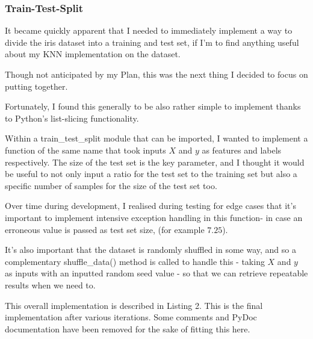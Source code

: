 \documentclass[letterpaper,10pt]{article}
\begin{document}
\subsubsection{Train-Test-Split}
It became quickly apparent that I needed to immediately implement a way to divide the iris dataset into a training and test set, if I'm to find anything useful about my KNN implementation on the dataset. \par
Though not anticipated by my Plan, this was the next thing I decided to focus on putting together. \par

Fortunately, I found this generally to be also rather simple to implement thanks to Python's list-slicing functionality. \par
Within a train\_test\_split module that can be imported, I wanted to implement a function of the same name that took inputs \(X\) and \(y\) as features and labels respectively. The size of the test set is the key parameter, and I thought it would be useful to not only input a ratio for the test set to the training set but also a specific number of samples for the size of the test set too. \par
Over time during development, I realised during testing for edge cases that it's important to implement intensive exception handling in this function- in case an erroneous value is passed as test set size, (for example \(7.25\)). \par
It's also important that the dataset is randomly shuffled in some way, and so a complementary shuffle\_data() method is called to handle this - taking \(X\) and \(y\) as inputs with an inputted random seed value - so that we can retrieve repeatable results when we need to. \par
This overall implementation is described in Listing 2. This is the final implementation after various iterations. Some comments and PyDoc documentation have been removed for the sake of fitting this here. \par
\end{document}
